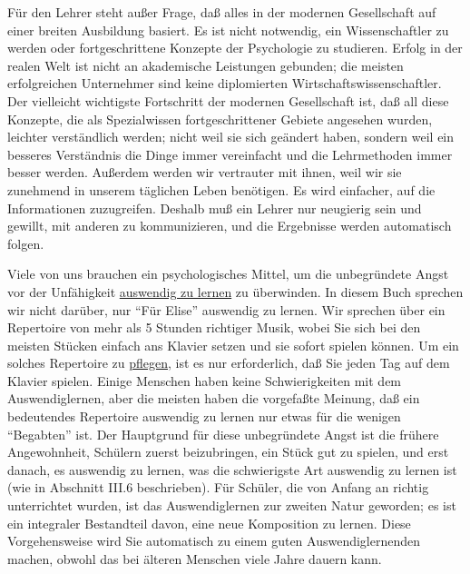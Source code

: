 Für den Lehrer steht außer Frage, daß alles in der modernen Gesellschaft auf einer breiten Ausbildung basiert.
Es ist nicht notwendig, ein Wissenschaftler zu werden oder fortgeschrittene Konzepte der Psychologie zu studieren.
Erfolg in der realen Welt ist nicht an akademische Leistungen gebunden; die meisten erfolgreichen Unternehmer sind keine diplomierten Wirtschaftswissenschaftler.
Der vielleicht wichtigste Fortschritt der modernen Gesellschaft ist, daß all diese Konzepte, die als Spezialwissen fortgeschrittener Gebiete angesehen wurden, leichter verständlich werden; nicht weil sie sich geändert haben, sondern weil ein besseres Verständnis die Dinge immer vereinfacht und die Lehrmethoden immer besser werden.
Außerdem werden wir vertrauter mit ihnen, weil wir sie zunehmend in unserem täglichen Leben benötigen.
Es wird einfacher, auf die Informationen zuzugreifen.
Deshalb muß ein Lehrer nur neugierig sein und gewillt, mit anderen zu kommunizieren, und die Ergebnisse werden automatisch folgen.

Viele von uns brauchen ein psychologisches Mittel, um die unbegründete Angst vor der Unfähigkeit \hyperlink{c1iii6}{auswendig zu lernen} zu überwinden.
In diesem Buch sprechen wir nicht darüber, nur \enquote{Für Elise} auswendig zu lernen.
Wir sprechen über ein Repertoire von mehr als 5 Stunden richtiger Musik, wobei Sie sich bei den meisten Stücken einfach ans Klavier setzen und sie sofort spielen können.
Um ein solches Repertoire zu \hyperlink{c1iii6k}{pflegen}, ist es nur erforderlich, daß Sie jeden Tag auf dem Klavier spielen.
Einige Menschen haben keine Schwierigkeiten mit dem Auswendiglernen, aber die meisten haben die vorgefaßte Meinung, daß ein bedeutendes Repertoire auswendig zu lernen nur etwas für die wenigen \enquote{Begabten} ist.
Der Hauptgrund für diese unbegründete Angst ist die frühere Angewohnheit, Schülern zuerst beizubringen, ein Stück gut zu spielen, und erst danach, es auswendig zu lernen, was die schwierigste Art auswendig zu lernen ist (wie in Abschnitt III.6 beschrieben).
Für Schüler, die von Anfang an richtig unterrichtet wurden, ist das Auswendiglernen zur zweiten Natur geworden; es ist ein integraler  Bestandteil davon, eine neue Komposition zu lernen.
Diese Vorgehensweise wird Sie automatisch zu einem guten Auswendiglernenden machen, obwohl das bei älteren Menschen viele Jahre dauern kann.

